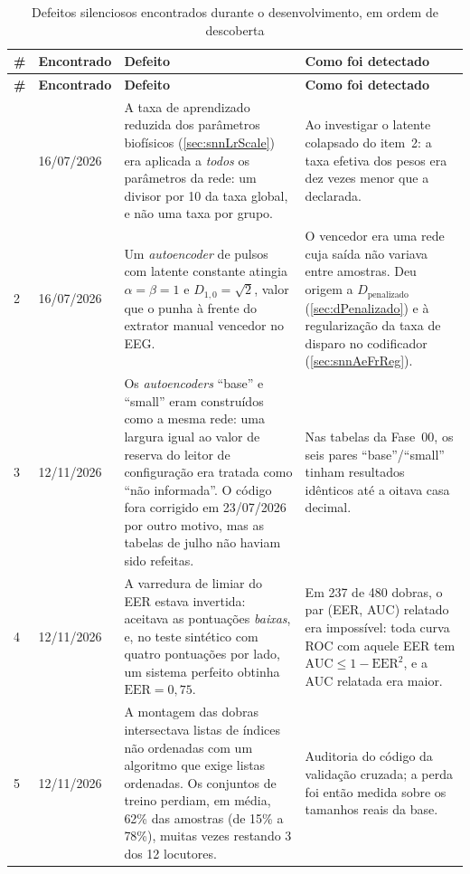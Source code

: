 \begin{apendicesenv}
		{\small
		\tableZebraStripe
		\begin{longtable}{@{}Y{0.04\textwidth}Y{0.13\textwidth}Y{0.36\textwidth}Y{0.39\textwidth}@{}}
			\caption[Defeitos silenciosos encontrados durante o desenvolvimento]{Defeitos silenciosos encontrados durante o desenvolvimento, em ordem de descoberta} \label{tab:defeitos} \\
			\tableHeaderRow \textbf{\#} & \textbf{Encontrado} & \textbf{Defeito} & \textbf{Como foi detectado} \\
			\endfirsthead
			\tableHeaderRow \textbf{\#} & \textbf{Encontrado} & \textbf{Defeito} & \textbf{Como foi detectado} \\
			\endhead
			\bottomrule
			 & 16/07/2026 & A taxa de aprendizado reduzida dos parâmetros biofísicos (\autoref{sec:snnLrScale}) era aplicada a \emph{todos} os parâmetros da rede: um divisor por 10 da taxa global, e não uma taxa por grupo. & Ao investigar o latente colapsado do item~2: a taxa efetiva dos pesos era dez vezes menor que a declarada. \\
			2 & 16/07/2026 & Um \textit{autoencoder} de pulsos com latente constante atingia $\alpha=\beta=1$ e $D_{1,0}=\sqrt2$, valor que o punha à frente do extrator manual vencedor no \ac{EEG}. & O vencedor era uma rede cuja saída não variava entre amostras. Deu origem a $D_{\text{penalizado}}$ (\autoref{sec:dPenalizado}) e à regularização da taxa de disparo no codificador (\autoref{sec:snnAeFrReg}). \\
			3 & 12/11/2026 & Os \textit{autoencoders} ``base'' e ``small'' eram construídos como a mesma rede: uma largura igual ao valor de reserva do leitor de configuração era tratada como ``não informada''. O código fora corrigido em 23/07/2026 por outro motivo, mas as tabelas de julho não haviam sido refeitas. & Nas tabelas da Fase~00, os seis pares ``base''/``small'' tinham resultados idênticos até a oitava casa decimal. \\
			4 & 12/11/2026 & A varredura de limiar do \ac{EER} estava invertida: aceitava as pontuações \emph{baixas}, e, no teste sintético com quatro pontuações por lado, um sistema perfeito obtinha $\text{EER}=0{,}75$. & Em 237 de 480 dobras, o par (\ac{EER}, \ac{AUC}) relatado era impossível: toda curva \ac{ROC} com aquele \ac{EER} tem $\text{AUC} \le 1-\text{EER}^2$, e a \ac{AUC} relatada era maior. \\
			5 & 12/11/2026 & A montagem das dobras intersectava listas de índices não ordenadas com um algoritmo que exige listas ordenadas. Os conjuntos de treino perdiam, em média, 62\% das amostras (de 15\% a 78\%), muitas vezes restando 3 dos 12 locutores. & Auditoria do código da validação cruzada; a perda foi então medida sobre os tamanhos reais da base. \\

\end{longtable}}
\end{apendicesenv}
